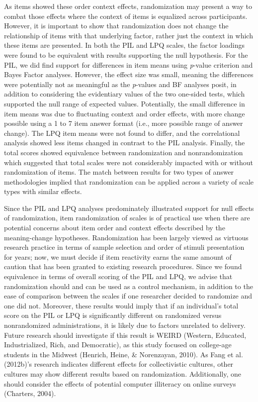 \documentclass[english,man, mask]{apa6}
\theoremstyle{definition}
\theoremstyle{definition}
\theoremstyle{definition}
\theoremstyle{remark}
\begin{document}
As items showed these order context effects, randomization may present a
way to combat those effects where the context of items is equalized
across participants. However, it is important to show that randomization
does not change the relationship of items with that underlying factor,
rather just the context in which these items are presented. In both the
PIL and LPQ scales, the factor loadings were found to be equivalent with
results supporting the null hypothesis. For the PIL, we did find support
for differences in item means using \emph{p}-value criterion and Bayes
Factor analyses. However, the effect size was small, meaning the
differences were potentially not as meaningful as the \emph{p}-values
and BF analyses posit, in addition to considering the evidentiary values
of the two one-sided tests, which supported the null range of expected
values. Potentially, the small difference in item means was due to
fluctuating context and order effects, with more change possible using a
1 to 7 item answer format (i.e., more possible range of answer change).
The LPQ item means were not found to differ, and the correlational
analysis showed less items changed in contrast to the PIL analysis.
Finally, the total scores showed equivalence between randomization and
nonrandomization which suggested that total scales were not considerably
impacted with or without randomization of items. The match between
results for two types of answer methodologies implied that randomization
can be applied across a variety of scale types with similar effects.

Since the PIL and LPQ analyses predominately illustrated support for
null effects of randomization, item randomization of scales is of
practical use when there are potential concerns about item order and
context effects described by the meaning-change hypotheses.
Randomization has been largely viewed as virtuous research practice in
terms of sample selection and order of stimuli presentation for years;
now, we must decide if item reactivity earns the same amount of caution
that has been granted to existing research procedures. Since we found
equivalence in terms of overall scoring of the PIL and LPQ, we advise
that randomization should and can be used as a control mechanism, in
addition to the ease of comparison between the scales if one researcher
decided to randomize and one did not. Moreover, these results would
imply that if an individual's total score on the PIL or LPQ is
significantly different on randomized versus nonrandomized
administrations, it is likely due to factors unrelated to delivery.
Future research should investigate if this result is WEIRD (Western,
Educated, Industrialized, Rich, and Democratic), as this study focused
on college-age students in the Midwest (Henrich, Heine, \& Norenzayan,
2010). As Fang et al. (2012b)'s research indicates different effects for
collectivistic cultures, other cultures may show different results based
on randomization. Additionally, one should consider the effects of
potential computer illiteracy on online surveys (Charters, 2004).
\end{document}
